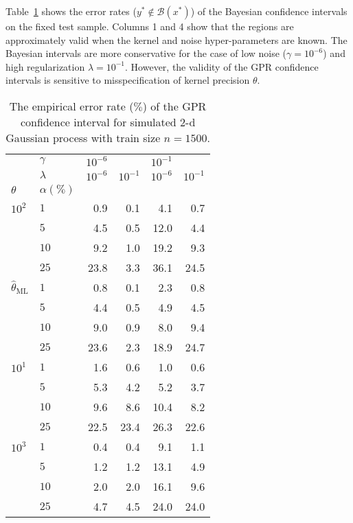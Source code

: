 \documentclass[conference]{IEEEtran}
\newcommand{\Bcal}{\mathcal{B}}
\begin{document}
Table~\ref{tab:gaussian_2d_cov_gpr} shows the error rates ($y^*\notin\Bcal(x^*)$)
of the Bayesian confidence intervals on the fixed test sample. Columns 1 and 4 show
that the regions are approximately valid when the kernel and noise hyper-parameters
are known. The Bayesian intervals are more conservative for the case of low noise
($\gamma=10^{-6}$) and high regularization $\lambda=10^{-1}$. However, the validity
of the GPR confidence intervals is sensitive to misspecification of kernel precision
$\theta$.
\begin{table}
\centering
  \caption{The empirical error rate ($\%$) of the GPR confidence interval for simulated
  $2$-d Gaussian process with train size $n=1500$.}
  \label{tab:gaussian_2d_cov_gpr}
  \begin{tabular}{ll||rr|rr}
  \toprule
       & $\gamma$ & $10^{-6}$ &          & $10^{-1}$ &          \\\cline{2-2}
       & $\lambda$ & $10^{-6}$ & $10^{-1}$ & $10^{-6}$ & $10^{-1}$ \\\cline{2-2}
  $\theta$ & $\alpha(\%)$ &          &          &          &          \\
  \midrule
  $10^2$ & $1$ &     0.9 &     0.1 &     4.1 &     0.7 \\
       & $5$ &     4.5 &     0.5 &    12.0 &     4.4 \\
       & $10$ &     9.2 &     1.0 &    19.2 &     9.3 \\
       & $25$ &    23.8 &     3.3 &    36.1 &    24.5 \\\cline{2-6}
  $\hat{\theta}_\text{ML}$ & $1$ &     0.8 &     0.1 &     2.3 &     0.8 \\
       & $5$ &     4.4 &     0.5 &     4.9 &     4.5 \\
       & $10$ &     9.0 &     0.9 &     8.0 &     9.4 \\
       & $25$ &    23.6 &     2.3 &    18.9 &    24.7 \\
  \midrule
  $10^1$ & $1$ &      1.6 &      0.6 &      1.0 &      0.6 \\
       & $5$ &      5.3 &      4.2 &      5.2 &      3.7 \\
       & $10$ &      9.6 &      8.6 &     10.4 &      8.2 \\
       & $25$ &     22.5 &     23.4 &     26.3 &     22.6 \\\cline{2-6}
  $10^3$ & $1$ &      0.4 &      0.4 &      9.1 &      1.1 \\
       & $5$ &      1.2 &      1.2 &     13.1 &      4.9 \\
       & $10$ &      2.0 &      2.0 &     16.1 &      9.6 \\
       & $25$ &      4.7 &      4.5 &     24.0 &     24.0 \\
  \bottomrule
  \end{tabular}
\end{table}
\end{document}
